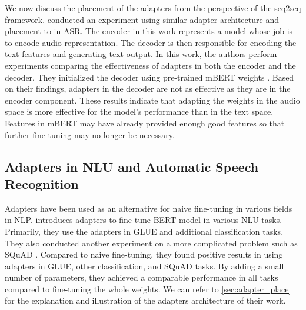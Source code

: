 We now discuss the placement of the adapters from the perspective of the seq2seq framework.  conducted an experiment using similar adapter architecture and placement to  in ASR. The encoder in this work represents a model whose job is to encode audio representation. The decoder is then responsible for encoding the text features and generating text output. In this work, the authors perform experiments comparing the effectiveness of adapters in both the encoder and the decoder. They initialized the decoder using pre-trained mBERT weights . Based on their findings, adapters in the decoder are not as effective as they are in the encoder component. These results indicate that adapting the weights in the audio space is more effective for the model's performance than in the text space. Features in mBERT may have already provided enough good features so that further fine-tuning may no longer be necessary.

\subsection{Adapters in NLU and Automatic Speech Recognition}
\label{sec:app_nlu_asr}
Adapters have been used as an alternative for naive fine-tuning in various fields in NLP.  introduces adapters to fine-tune BERT model in various NLU tasks. Primarily, they use the adapters in GLUE  and additional classification tasks. They also conducted another experiment on a more complicated problem such as SQuAD . Compared to naive fine-tuning, they found positive results in using adapters in GLUE, other classification, and SQuAD tasks. By adding a small number of parameters, they achieved a comparable performance in all tasks compared to fine-tuning the whole weights. We can refer to \cref{sec:adapter_place} for the explanation and illustration of the adapters architecture of their work.

